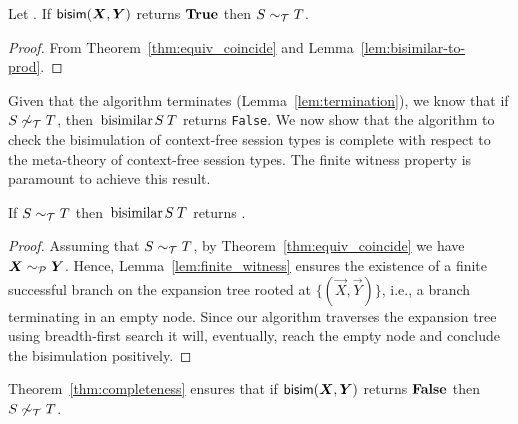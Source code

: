\begin{theorem}[Soundness]
  \label{thm:soundness}
  Let \grmcontext.  If $\Bisim(\vec X,\vec Y)$ returns $\mathbf{True}$ then
  $S\sim_\mathcal T T$.
\end{theorem}
%
\begin{proof}
  From Theorem~\ref{thm:equiv_coincide} and
  Lemma~\ref{lem:bisimilar-to-prod}.
\end{proof}

 
Given that the algorithm terminates (Lemma~\ref{lem:termination}), we
know that if $S\not\sim_\mathcal T T$, then $\bisimf ST$ returns
\lstinline|False|.
%
We now show that the algorithm to check the bisimulation of
context-free session types is complete with respect to the meta-theory
of context-free session types. The finite witness property is
paramount to achieve this result.

\begin{theorem}[Completeness]
\label{thm:completeness}
  If $S \sim_\mathcal T T$ then $\bisimf S T$ returns
  .
\end{theorem}
%
\begin{proof}
  Assuming that $S \sim_\mathcal T T$, by Theorem~\ref{thm:equiv_coincide}
  we have $\vec X \ProdEquiv \vec Y$.  Hence,
  Lemma~\ref{lem:finite_witness} ensures the existence of a finite
  successful branch on the expansion tree rooted at
  $\{(\vec X,\vec Y)\}$, i.e., a branch terminating in an empty
  node.  Since our algorithm traverses the expansion tree using
  breadth-first search it will, eventually, reach the empty node and
  conclude the bisimulation positively.
\end{proof}

Theorem~\ref{thm:completeness} ensures that if $\Bisim(\vec X,\vec Y)$
returns $\mathbf{False}$ then $S \not\sim_\mathcal T T$. 


